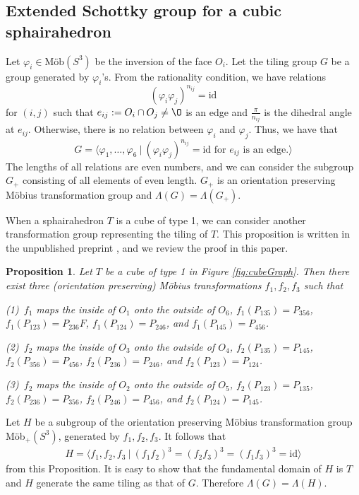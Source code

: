 \documentclass[suppldata, dvipdfmx]{interact}
\theoremstyle{plain}%
\newtheorem{proposition}[theorem]{Proposition}
\theoremstyle{definition}
\theoremstyle{remark}
\theoremstyle{problemstyle}
\begin{document}
\subsection{Extended Schottky group for a cubic sphairahedron}\label{extend}

Let $\varphi_i \in \text{M\"ob}(S^3)$ be the inversion of the face $O_i$.
Let the tiling group $G$ be a group generated by $\varphi_i$'s. From the rationality condition, we
have relations
\[
 (\varphi_i \varphi_j)^{n_{ij}} = \text{id}
\]
for $(i, j)$ such that $e_{ij}:=O_i\cap O_j \neq \O$ is an edge and $\frac{\pi}{n_{ij}}$ is the dihedral angle at $e_{ij}$.  Otherwise,
there is no relation between $\varphi_i$ and $\varphi_j$.
Thus, we have that
\[
G = \langle \varphi_1, \ldots,\varphi_6~|~(\varphi_i\varphi_j)^{n_{ij}} = \text{id} \text{ for }
 e_{ij}\text{ is an edge.}\rangle
\]
The lengths of all relations are even numbers, and we can consider the subgroup $G_+$
consisting of all elements of even length.  $G_+$ is an orientation preserving M\"obius transformation group and $\Lambda(G)=\Lambda(G_+)$.

When a sphairahedron $T$ is a cube of type 1, we can consider another transformation group representing the tiling of $T$.  This proposition is written in the unpublished preprint \cite{AharaAraki2}, and we review the proof in this paper.

\begin{proposition}
Let $T$ be a cube of type 1 in Figure \ref{fig:cubeGraph}. Then there exist three (orientation preserving) M\"obius transformations $f_1, f_2, f_3$ such that \par
(1)\ $f_1$ maps the inside of $O_1$ onto the outside of
     $O_6$, $f_1(P_{135}) = P_{356}$, $f_1(P_{123}) = P_{236}F$,  
$f_1(P_{124}) = P_{246}$, and $f_1(P_{145}) = P_{456}$.\par
(2)\ $f_2$ maps the inside of $O_3$ onto the outside of $O_4$, 
$f_2(P_{135}) = P_{145}$, $f_2(P_{356}) = P_{456}$,  
$f_2(P_{236}) = P_{246}$, and $f_2(P_{123}) = P_{124}$.      \par       
(3)\ $f_2$ maps the inside of $O_2$ onto the outside of $O_5$, 
$f_2(P_{123}) = P_{135}$, $f_2(P_{236}) = P_{356}$,  
$f_2(P_{246}) = P_{456}$, and $f_2(P_{124}) = P_{145}$.             
\end{proposition}

Let $H$ be a subgroup of the orientation preserving M\"obius transformation group M\"ob$_+(S^3)$, 
generated by $f_1, f_2, f_3$. It follows that
\begin{align*}
 H = \langle f_1, f_2, f_3~|~(f_1f_2)^3 = (f_2f_3)^3 = (f_1f_3)^3 = \text{id} \rangle
\end{align*}
from this Proposition.  It is easy to show that the fundamental domain of $H$ is $T$ and $H$ generate the same tiling as that of $G$.  Therefore $\Lambda(G)=\Lambda(H)$.
\end{document}
